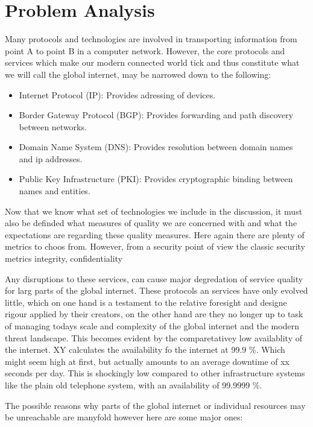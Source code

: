 \documentclass[../eva1_scion.tex]{subfiles}
\begin{document}
\chapter{Problem Analysis}\label{ch:analysis}

Many protocols and technologies are involved in transporting information from point A to point B in a computer network. However, the core protocols and services which make our modern connected world tick and thus constitute what we will call the global internet, may be narrowed down to the following:

\begin{itemize}
    \item Internet Protocol (IP): Provides adressing of devices.
    \item Border Gateway Protocol (BGP): Provides forwarding and path discovery between networks.
    \item Domain Name System (DNS): Provides resolution between domain names and ip addresses.
    \item Public Key Infrastructure (PKI): Provides cryptographic binding between names and entities.
\end{itemize}

Now that we know what set of technologies we include in the discussion, it must also be definded what measures of quality we are concerned with and what the expectations are regarding these quality measures. Here again there are plenty of metrics to choos from. However, from a security point of view the classic security metrics integrity, confidentiality


Any disruptions to these services, can cause major degredation of service quality for larg parts of the global internet.  These protocols an services have only evolved little, which on one hand is a testament to the relative foresight and designe rigour applied by their creators, on the other hand are they no longer up to task of managing todays scale and complexity of the global internet and the modern threat landscape. This becomes evident by the comparetativey low availablity of the internet. XY calculates the availability fo the internet at 99.9 \%. Which might seem high at first, but actually amounts to an average downtime of xx seconds per day. This is shockingly low compared to other infrastructure systems like the plain old telephone system, with an availability of 99.9999 \%. 

The possible reasons why parts of the global internet or individual resources may be unreachable are manyfold however here are some major ones:
\end{document}
